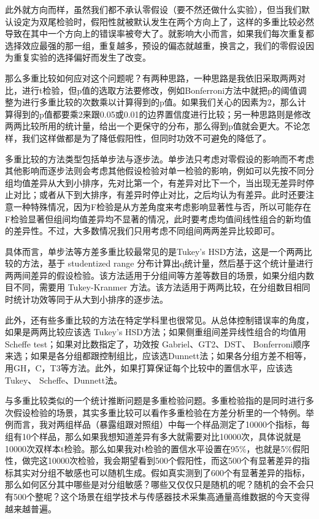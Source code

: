 \documentclass[]{tufte-book}
\begin{document}
此外就方向而样，虽然我们都不承认零假设（要不然还做什么实验），但当我们默认设定为双尾检验时，假阳性就被默认发生在两个方向上了，这样的多重比较必然导致在其中一个方向上的错误率被夸大了。就影响大小而言，如果我们每次重复都选择效应最强的那一组，重复越多，预设的偏态就越重，换言之，我们的零假设因为重复实验的选择偏好而发生了改变。

那么多重比较如何应对这个问题呢？有两种思路，一种思路是我依旧采取两两对比，进行t检验，但p值的选取方法要修改，例如Bonferroni方法中就把p的阈值调整为进行多重比较的次数乘以计算得到的p值。如果我们关心的因素为2，那么计算得到的p值都要乘2来跟0.05或0.01的边界置信度进行比较；另一种思路则是修改两两比较所用的统计量，给出一个更保守的分布，那么得到p值就会更大。不论怎样，我们这样做都是为了降低假阳性，但同时功效不可避免的降低了。

多重比较的方法类型包括单步法与逐步法。单步法只考虑对零假设的影响而不考虑其他影响而逐步法则会考虑其他假设检验对单一检验的影响，例如可以先按不同分组均值差异从大到小排序，先对比第一个，有差异对比下一个，当出现无差异时停止对比；或者从下到大排序，有差异时停止对比，之后均认为有差异。此时还要注意一种特殊情况，因为F检验是从方差角度来考虑影响显著性与否，所以可能存在F检验显著但组间均值差异均不显著的情况，此时要考虑均值间线性组合的新均值的差异性。不过，大多数情况我们只用考虑不同组间两两差异比较即可。

具体而言，单步法等方差多重比较最常见的是Tukey's HSD方法，这是一个两两比较的方法，基于 studentized range 分布计算出q统计量，然后基于这个统计量进行两两间差异的假设检验。该方法适用于分组间等方差等数目的场景，如果分组内数目不同，需要用 Tukey-Kranmer 方法。该方法适用于两两比较，在分组数目相同时统计功效等同于从大到小排序的逐步法。

此外，还有些多重比较的方法在特定学科里也很常见。从总体控制错误率的角度，如果是两两比较应该选 Tukey's HSD方法；如果侧重组间差异线性组合的均值用 Scheffe test；如果对比数指定了，功效按 Gabriel、GT2、DST、 Bonferroni顺序来选；如果是各分组都跟控制组比，应该选Dunnett法；如果各分组方差不相等，用GH，C，T3等方法。此外，如果打算保证每个比较中的置信水平，应该选 Tukey、 Scheffe、Dunnett法。

与多重比较类似的一个统计推断问题是多重检验问题。多重检验指的是同时进行多次假设检验的场景，其实多重比较可以看作多重检验在方差分析里的一个特例。举例而言，我对两组样品（暴露组跟对照组）中每一个样品测定了10000个指标，每组有10个样品，那么如果我想知道差异有多大就需要对比10000次，具体说就是10000次双样本t检验。那么如果我对t检验的置信水平设置在95\%，也就是5\%假阳性，做完这10000次检验，我会期望看到500个假阳性，而这500个有显著差异的指标其实对分组不敏感也可以随机生成。假如真实测到了600个有显著差异的指标，那么如何区分其中哪些是对分组敏感？哪些又仅仅只是随机的呢？随机的会不会只有500个整呢？这个场景在组学技术与传感器技术采集高通量高维数据的今天变得越来越普遍。
\end{document}

